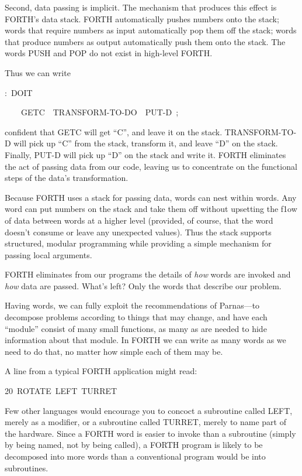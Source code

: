Second, data passing is implicit. The mechanism that produces this
effect is FORTH's data stack. FORTH automatically pushes numbers onto
the stack; words that require numbers as input automatically pop them
off the stack; words that produce numbers as output automatically
push them onto the stack. The words PUSH and POP do not exist in high-level
FORTH.

Thus we can write

\begin{lyxcode}
:~DOIT

~~~~GETC~~TRANSFORM-TO-DO~~PUT-D~;
\end{lyxcode}
confident that GETC will get {}``C'', and leave it on the stack.
TRANSFORM-TO-D will pick up {}``C'' from the stack, transform it,
and leave {}``D'' on the stack. Finally, PUT-D will pick up {}``D''
on the stack and write it. FORTH eliminates the act of passing data
from our code, leaving us to concentrate on the functional steps of
the data's transformation.

Because FORTH uses a stack for passing data, words can nest within
words. Any word can put numbers on the stack and take them off without
upsetting the f1ow of data between words at a higher level (provided,
of course, that the word doesn't consume or leave any unexpected values).
Thus the stack supports structured, modular programming while providing
a simple mechanism for passing local arguments.

FORTH eliminates from our programs the details of \emph{how} words
are invoked and \emph{how} data are passed. What's left? Only the
words that describe our problem.

Having words, we can fully exploit the recommendations of Parnas---to
decompose problems according to things that may change, and have each
{}``module'' consist of many small functions, as many as are needed
to hide information about that module. In FORTH we can write as many
words as we need to do that, no matter how simple each of them may
be.

A line from a typical FORTH application might read:

\begin{lyxcode}
20~ROTATE~LEFT~TURRET
\end{lyxcode}
Few other languages would encourage you to concoct a subroutine called
LEFT, merely as a modifier, or a subroutine called TURRET, merely
to name part of the hardware. Since a FORTH word is easier to invoke
than a subroutine (simply by being named, not by being called), a
FORTH program is likely to be decomposed into more words than a conventional
program would be into subroutines.


